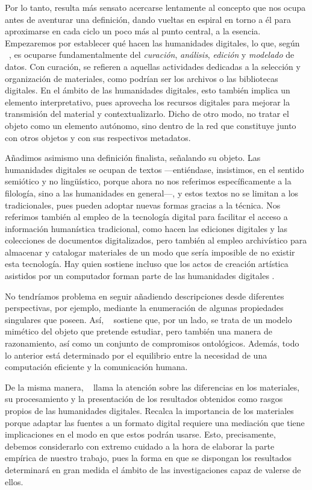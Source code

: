 Por lo tanto, resulta más sensato acercarse lentamente al concepto que nos ocupa antes de aventurar una definición, dando vueltas en espiral en torno a él para aproximarse en cada ciclo un poco más al punto central, a la esencia. Empezaremos por establecer qué hacen las humanidades digitales, lo que, según \citeauthor{burdick2012}~\parencite*[17-20]{burdick2012}, es ocuparse fundamentalmente del \textit{curación}, \textit{análisis}, \textit{edición} y \textit{modelado} de datos. Con curación, se refieren a aquellas actividades dedicadas a la selección y organización de materiales, como podrían ser los archivos o las bibliotecas digitales. En el ámbito de las humanidades digitales, esto también implica un elemento interpretativo, pues aprovecha los recursos digitales para mejorar la transmisión del material y contextualizarlo. Dicho de otro modo, no tratar el objeto como un elemento autónomo, sino dentro de la red que constituye junto con otros objetos y con sus respectivos metadatos.  

Añadimos asimismo una definición finalista, señalando su objeto. Las humanidades digitales se ocupan de textos —entiéndase, insistimos, en el sentido semiótico y no lingüístico, porque ahora no nos referimos específicamente a la filología, sino a las humanidades en general—, y estos textos no se limitan a los tradicionales, pues pueden adoptar nuevas formas gracias a la técnica. Nos referimos también al empleo de la tecnología digital para facilitar el acceso a información humanística tradicional, como hacen las ediciones digitales y las colecciones de documentos digitalizados, pero también al empleo archivístico para almacenar y catalogar materiales de un modo que sería imposible de no existir esta tecnología. Hay quien sostiene incluso que los actos de creación artística asistidos por un computador forman parte de las humanidades digitales \parencite[52-55]{scholes2008}.

No tendríamos problema en seguir añadiendo descripciones desde diferentes perspectivas, por ejemplo, mediante la enumeración de algunas propiedades singulares que poseen.  Así, \citeauthor{unsworth2002}~\parencite*{unsworth2002} sostiene que, por un lado, se trata de un modelo mimético del objeto que pretende estudiar, pero también una manera de razonamiento, así como un conjunto de compromisos ontológicos. Además, todo lo anterior está determinado por el equilibrio entre la necesidad de una computación eficiente y la comunicación humana.

De la misma manera, \citeauthor{drucker2021}~\parencite*[2]{drucker2021} llama la atención sobre las diferencias en los materiales, su procesamiento y la presentación de los resultados obtenidos como rasgos propios de las humanidades digitales. Recalca la importancia de los materiales porque adaptar las fuentes a un formato digital requiere una mediación que tiene implicaciones en el modo en que estos podrán usarse. Esto, precisamente, debemos considerarlo con extremo cuidado a la hora de elaborar la parte empírica de nuestro trabajo, pues la forma en que se dispongan los resultados determinará en gran medida el ámbito de las investigaciones capaz de valerse de ellos. 

